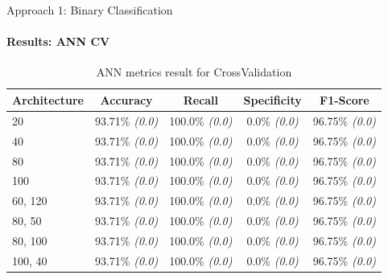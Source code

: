 \documentclass[9pt, pstricks, xcolor=dvipsnames]{beamer}
\begin{document}
\begin{frame}{Approach 1: Binary Classification}
\framesubtitle{Results: ANN CV}

\begin{table}[h]
    \centering
    \begin{tabular}{lcccc}
        \toprule
        Architecture & Accuracy & Recall & Specificity & F1-Score \\
        \midrule
        20 & 93.71\% \textit{(0.0)} & 100.0\% \textit{(0.0)} & 0.0\% \textit{(0.0)} & 96.75\% \textit{(0.0)} \\
        40 & 93.71\% \textit{(0.0)} & 100.0\% \textit{(0.0)} & 0.0\% \textit{(0.0)} & 96.75\% \textit{(0.0)} \\
        80 & 93.71\% \textit{(0.0)} & 100.0\% \textit{(0.0)} & 0.0\% \textit{(0.0)} & 96.75\% \textit{(0.0)} \\
        100 & 93.71\% \textit{(0.0)} & 100.0\% \textit{(0.0)} & 0.0\% \textit{(0.0)} & 96.75\% \textit{(0.0)} \\
        60, 120 & 93.71\% \textit{(0.0)} & 100.0\% \textit{(0.0)} & 0.0\% \textit{(0.0)} & 96.75\% \textit{(0.0)} \\
        80, 50 & 93.71\% \textit{(0.0)} & 100.0\% \textit{(0.0)} & 0.0\% \textit{(0.0)} & 96.75\% \textit{(0.0)} \\
        80, 100 & 93.71\% \textit{(0.0)} & 100.0\% \textit{(0.0)} & 0.0\% \textit{(0.0)} & 96.75\% \textit{(0.0)} \\
        100, 40 & 93.71\% \textit{(0.0)} & 100.0\% \textit{(0.0)} & 0.0\% \textit{(0.0)} & 96.75\% \textit{(0.0)} \\
        \bottomrule
    \end{tabular}
    \caption{ANN metrics result for CrossValidation}
    \label{tab:ann_CV_approach1}
    \end{table}

\end{frame}
\end{document}
